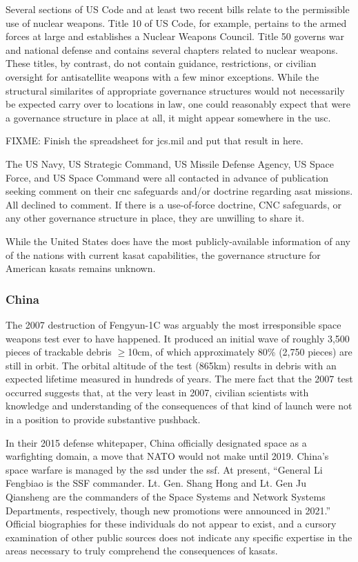 Several sections of US Code and at least two recent bills relate to
the permissible use of nuclear weapons.  Title 10 of US Code, for
example, pertains to the armed forces at large and establishes a
Nuclear Weapons Council.  Title 50 governs war and national defense
and contains several chapters related to nuclear weapons.  These
titles, by contrast, do not contain guidance, restrictions, or
civilian oversight for antisatellite weapons with a few minor
exceptions.  While the structural similarites of appropriate
governance structures would not necessarily be expected carry over to
locations in law, one could reasonably expect that were a governance
structure in place at all, it might appear somewhere in the \acf{usc}.

FIXME: Finish the spreadsheet for jcs.mil and put that result in here.

The US Navy, US Strategic Command, US Missile Defense Agency, US Space
Force, and US Space Command were all contacted in advance of
publication seeking comment on their \ac{cnc} safeguards and/or
doctrine regarding \ac{asat} missions.  All declined to comment.  If
there is a use-of-force doctrine, CNC safeguards, or any other
governance structure in place, they are unwilling to share it.

While the United States does have the most publicly-available
information of any of the nations with current \ac{kasat}
capabilities, the governance structure for American \acp{kasat}
remains unknown.


\subsubsection{China}

The 2007 destruction of Fengyun-1C was arguably the most irresponsible
space weapons test ever to have happened.  It produced an initial wave
of roughly 3,500 pieces of trackable debris $\ge$10cm, of which
approximately 80\% (2,750 pieces) are still in
orbit.\cite[p05-01]{brian} The orbital altitude of the test (865km)
results in debris with an expected lifetime measured in hundreds of
years.\cite[fig from SpaceX]{rando-orbit} The mere fact that the 2007
test occurred suggests that, at the very least in 2007, civilian
scientists with knowledge and understanding of the consequences of
that kind of launch were not in a position to provide substantive
pushback.

In their 2015 defense whitepaper\cite{china-debutant}, China
officially designated space as a warfighting domain, a move that NATO
would not make until 2019.\cite{nato-likes-space} China's space
warfare is managed by the \ac{ssd} under the
\ac{ssf}.\cite[p65]{osd-china-21} At present, ``General Li Fengbiao is
the SSF commander. Lt. Gen. Shang Hong and Lt. Gen Ju Qiansheng are
the commanders of the Space Systems and Network Systems Departments,
respectively, though new promotions were announced in 2021.''
\cite[p65]{osd-china-21} Official biographies for these individuals do
not appear to exist, and a cursory examination of other public sources
does not indicate any specific expertise in the areas necessary to
truly comprehend the consequences of \acp{kasat}.

